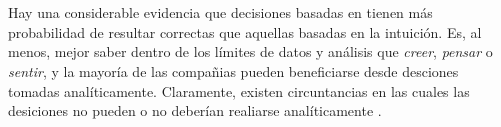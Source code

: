 
\section{\AnalyticsCPT}


Hay una considerable evidencia que decisiones basadas en \analytics tienen más probabilidad de resultar correctas que aquellas basadas en la intuición. Es, al menos, mejor saber dentro de los límites de datos y análisis que \textit{creer}, \textit{pensar} o \textit{sentir}, y la mayoría de las compañias pueden beneficiarse desde desciones tomadas analíticamente. Claramente, existen circuntancias en las cuales las desiciones no pueden o no deberían realiarse analíticamente \cite{davenport2007competing}.







